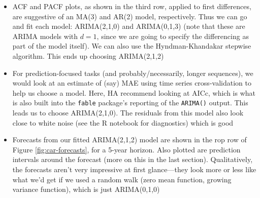 \documentclass{article}
\begin{document}
\begin{itemize}
\item ACF and PACF plots, as shown in the third row, applied to first
  differences, are suggestive of an MA(3) and AR(2) model, respectively. Thus we 
  can go and fit each model: ARIMA(2,1,0) and ARIMA(0,1,3) (note that these are
  ARIMA models with $d=1$, since we are going to specify the differencing as
  part of the model itself). We can also use the Hyndman-Khandakar stepwise
  algorithm. This ends up choosing ARIMA(2,1,2) 

\item For prediction-focused tasks (and probably/necessarily, longer sequences),
  we would look at an estimate of (say) MAE using time series cross-validation
  to help us choose a model. Here, HA recommend looking at AICc, which is what
  is also built into the \verb|fable| package's reporting of the \verb|ARIMA()| 
  output. This leads us to choose ARIMA(2,1,0). The residuals from this model
  also look close to white noise (see the R notebook for diagnostics) which is
  good  

\item Forecasts from our fitted ARIMA(2,1,2) model are shown in the rop row of
  Figure \ref{fig:car-forecasts}, for a 5-year horizon. Also plotted are
  prediction intervals around the forecast (more on this in the last 
  section). Qualitatively, the forecasts aren't very impressive at first
  glance---they look more or less like what we'd get if we used a random walk
  (zero mean function, growing variance function), which is just ARIMA(0,1,0)   


\end{itemize}
\end{document}
